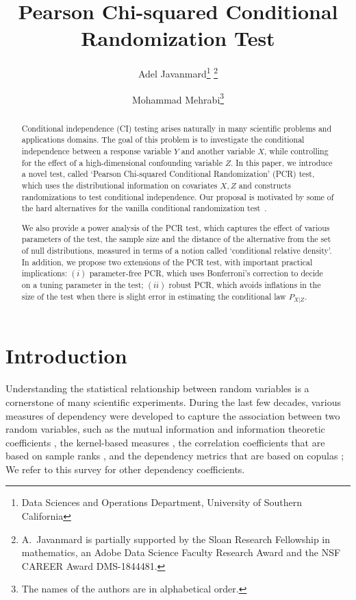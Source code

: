 \documentclass[11pt]{article}
\title{\bf Pearson Chi-squared Conditional Randomization Test}
\author{ 
Adel Javanmard\thanks{Data Sciences and Operations Department, University
of Southern California} \thanks{A.~Javanmard is partially supported by the Sloan Research Fellowship
in mathematics, an Adobe Data Science Faculty Research Award and the
NSF CAREER Award DMS-1844481.} \and 
Mohammad Mehrabi\footnotemark[1] \thanks{The names of the authors are in alphabetical order. }
}
\begin{document}
\maketitle
\begin{abstract}
Conditional independence (CI) testing arises naturally in many scientific problems and applications domains. The goal of this problem is to investigate the conditional independence between a response variable $Y$ and another variable $X$, while controlling for the effect of a high-dimensional confounding variable $Z$. In this paper, we introduce a novel test, called `Pearson Chi-squared Conditional Randomization' (PCR) test,  which uses the distributional information on covariates $X,Z$ and constructs randomizations to test conditional independence.  Our proposal is motivated by some of the hard alternatives for the vanilla conditional randomization test~\cite{candes2018panning}.  

We also provide a power analysis of the PCR test, which captures the effect of various parameters of the test, the sample size and the distance of the alternative from the set of null distributions, measured in terms of a notion called `conditional relative density'.  In addition, we propose two extensions of the PCR test, with important practical implications: $(i)$ parameter-free PCR, which uses Bonferroni's correction to decide on a tuning parameter in the test; $(ii)$ robust PCR, which avoids inflations in the size of the test when there is slight error in estimating the conditional law $P_{X|Z}$. 
\end{abstract}

\section{Introduction}

Understanding the statistical relationship between random variables is a cornerstone of many scientific experiments. During the last few decades, various measures of dependency were developed to capture the association between two random variables, such as the mutual information and information theoretic coefficients \cite{reshef2011detecting}, the kernel-based measures \cite{pfister2018kernel, zhang2018large}, the correlation coefficients that are based on sample ranks 
\cite{drton2018high, deb2021multivariate, weihs2018symmetric}, and the dependency metrics that are based on copulas \cite{zhang2019bet, shih2021copula}; We refer to this survey \cite{jossea2013measures} for other dependency coefficients.
\end{document}
